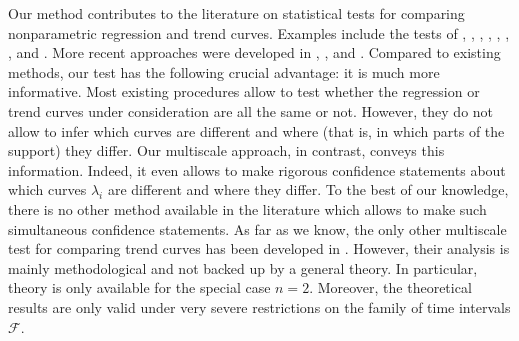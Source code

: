 \documentclass[a4paper,12pt]{article}
\numberwithin{equation}{section}
\begin{document}
Our method contributes to the literature on statistical tests for comparing nonparametric regression and trend curves. Examples include the tests of \cite{HaerdleMarron1990}, \cite{Hall1990}, \cite{King1991}, \cite{Delgado1993}, \cite{Kulasekera1995}, \cite{YoungBowman1995}, \cite{MunkDette1998}, \cite{NeumeyerDette2003} and \cite{Pardo-Fernandez2007}. More recent approaches were developed in \cite{DegrasWu2012}, \cite{Zhang2012}, \cite{Hidalgo2014} and \cite{ChenWu2018}. Compared to existing methods, our test has the following crucial advantage: it is much more informative. 
Most existing procedures allow to test whether the regression or trend curves under consideration are all the same or not. However, they do not allow to infer which curves are different and where (that is, in which parts of the support) they differ. Our multiscale approach, in contrast, conveys this information. Indeed, it even allows to make rigorous confidence statements about which curves $\lambda_i$ are different and where they differ. To the best of our knowledge, there is no other method available in the literature which allows to make such simultaneous confidence statements. As far as we know, the only other multiscale test for comparing trend curves has been developed in \cite{Park2009}. However, their analysis is mainly methodological and not backed up by a general theory. In particular, theory is only available for the special case $n = 2$. Moreover, the theoretical results are only valid under very severe restrictions on the family of time intervals $\mathcal{F}$. 


\end{document}
